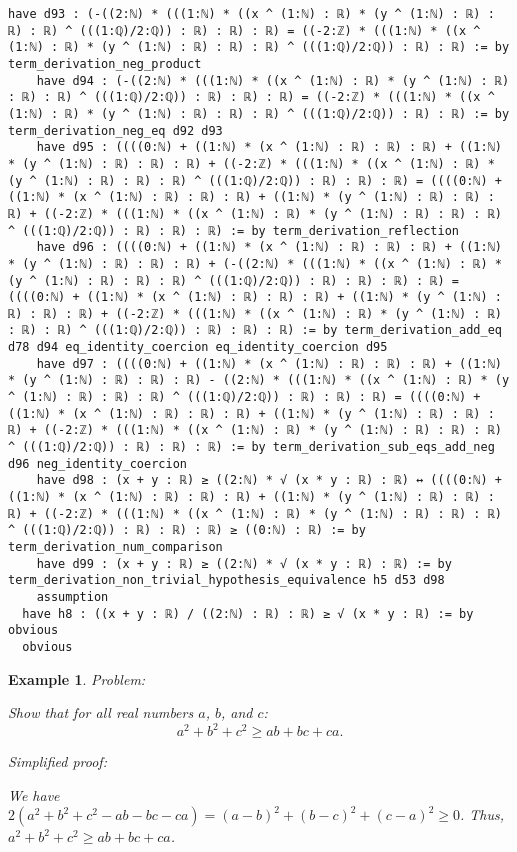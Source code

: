 \documentclass{article}
\newtheorem{example}{Example}
\begin{document}
\begin{tcolorbox}[colback=white!10, width=\linewidth]
\begin{lstlisting}[language=Lean4]
    have d93 : (-((2:ℕ) * (((1:ℕ) * ((x ^ (1:ℕ) : ℝ) * (y ^ (1:ℕ) : ℝ) : ℝ) : ℝ) ^ (((1:ℚ)/2:ℚ)) : ℝ) : ℝ) : ℝ) = ((-2:ℤ) * (((1:ℕ) * ((x ^ (1:ℕ) : ℝ) * (y ^ (1:ℕ) : ℝ) : ℝ) : ℝ) ^ (((1:ℚ)/2:ℚ)) : ℝ) : ℝ) := by term_derivation_neg_product
    have d94 : (-((2:ℕ) * (((1:ℕ) * ((x ^ (1:ℕ) : ℝ) * (y ^ (1:ℕ) : ℝ) : ℝ) : ℝ) ^ (((1:ℚ)/2:ℚ)) : ℝ) : ℝ) : ℝ) = ((-2:ℤ) * (((1:ℕ) * ((x ^ (1:ℕ) : ℝ) * (y ^ (1:ℕ) : ℝ) : ℝ) : ℝ) ^ (((1:ℚ)/2:ℚ)) : ℝ) : ℝ) := by term_derivation_neg_eq d92 d93
    have d95 : ((((0:ℕ) + ((1:ℕ) * (x ^ (1:ℕ) : ℝ) : ℝ) : ℝ) + ((1:ℕ) * (y ^ (1:ℕ) : ℝ) : ℝ) : ℝ) + ((-2:ℤ) * (((1:ℕ) * ((x ^ (1:ℕ) : ℝ) * (y ^ (1:ℕ) : ℝ) : ℝ) : ℝ) ^ (((1:ℚ)/2:ℚ)) : ℝ) : ℝ) : ℝ) = ((((0:ℕ) + ((1:ℕ) * (x ^ (1:ℕ) : ℝ) : ℝ) : ℝ) + ((1:ℕ) * (y ^ (1:ℕ) : ℝ) : ℝ) : ℝ) + ((-2:ℤ) * (((1:ℕ) * ((x ^ (1:ℕ) : ℝ) * (y ^ (1:ℕ) : ℝ) : ℝ) : ℝ) ^ (((1:ℚ)/2:ℚ)) : ℝ) : ℝ) : ℝ) := by term_derivation_reflection
    have d96 : ((((0:ℕ) + ((1:ℕ) * (x ^ (1:ℕ) : ℝ) : ℝ) : ℝ) + ((1:ℕ) * (y ^ (1:ℕ) : ℝ) : ℝ) : ℝ) + (-((2:ℕ) * (((1:ℕ) * ((x ^ (1:ℕ) : ℝ) * (y ^ (1:ℕ) : ℝ) : ℝ) : ℝ) ^ (((1:ℚ)/2:ℚ)) : ℝ) : ℝ) : ℝ) : ℝ) = ((((0:ℕ) + ((1:ℕ) * (x ^ (1:ℕ) : ℝ) : ℝ) : ℝ) + ((1:ℕ) * (y ^ (1:ℕ) : ℝ) : ℝ) : ℝ) + ((-2:ℤ) * (((1:ℕ) * ((x ^ (1:ℕ) : ℝ) * (y ^ (1:ℕ) : ℝ) : ℝ) : ℝ) ^ (((1:ℚ)/2:ℚ)) : ℝ) : ℝ) : ℝ) := by term_derivation_add_eq d78 d94 eq_identity_coercion eq_identity_coercion d95
    have d97 : ((((0:ℕ) + ((1:ℕ) * (x ^ (1:ℕ) : ℝ) : ℝ) : ℝ) + ((1:ℕ) * (y ^ (1:ℕ) : ℝ) : ℝ) : ℝ) - ((2:ℕ) * (((1:ℕ) * ((x ^ (1:ℕ) : ℝ) * (y ^ (1:ℕ) : ℝ) : ℝ) : ℝ) ^ (((1:ℚ)/2:ℚ)) : ℝ) : ℝ) : ℝ) = ((((0:ℕ) + ((1:ℕ) * (x ^ (1:ℕ) : ℝ) : ℝ) : ℝ) + ((1:ℕ) * (y ^ (1:ℕ) : ℝ) : ℝ) : ℝ) + ((-2:ℤ) * (((1:ℕ) * ((x ^ (1:ℕ) : ℝ) * (y ^ (1:ℕ) : ℝ) : ℝ) : ℝ) ^ (((1:ℚ)/2:ℚ)) : ℝ) : ℝ) : ℝ) := by term_derivation_sub_eqs_add_neg d96 neg_identity_coercion
    have d98 : (x + y : ℝ) ≥ ((2:ℕ) * √ (x * y : ℝ) : ℝ) ↔ ((((0:ℕ) + ((1:ℕ) * (x ^ (1:ℕ) : ℝ) : ℝ) : ℝ) + ((1:ℕ) * (y ^ (1:ℕ) : ℝ) : ℝ) : ℝ) + ((-2:ℤ) * (((1:ℕ) * ((x ^ (1:ℕ) : ℝ) * (y ^ (1:ℕ) : ℝ) : ℝ) : ℝ) ^ (((1:ℚ)/2:ℚ)) : ℝ) : ℝ) : ℝ) ≥ ((0:ℕ) : ℝ) := by term_derivation_num_comparison
    have d99 : (x + y : ℝ) ≥ ((2:ℕ) * √ (x * y : ℝ) : ℝ) := by term_derivation_non_trivial_hypothesis_equivalence h5 d53 d98
    assumption
  have h8 : ((x + y : ℝ) / ((2:ℕ) : ℝ) : ℝ) ≥ √ (x * y : ℝ) := by obvious
  obvious

\end{lstlisting}
\end{tcolorbox}


\begin{example}
Problem:
\begin{tcolorbox}[colback=yellow!10, width=\linewidth]
Show that for all real numbers $a$, $b$, and $c$:
    $$a^2 + b^2 + c^2 \geq ab + bc + ca.$$
\end{tcolorbox}

Simplified proof:
\begin{tcolorbox}[colback=blue!10, width=\linewidth]
We have $2(a^2 + b^2 + c^2 - ab - bc - ca) = (a-b)^2 + (b-c)^2 + (c-a)^2 \ge 0$. Thus, $a^2 + b^2 + c^2 \geq ab + bc + ca$.
\end{tcolorbox}
\end{example}
\end{document}
